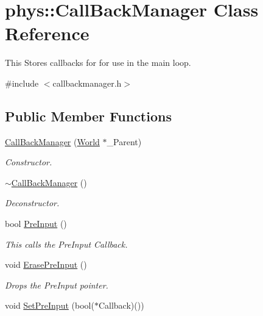 \hypertarget{classphys_1_1CallBackManager}{
\section{phys::CallBackManager Class Reference}
\label{d1/d47/classphys_1_1CallBackManager}
}


This Stores callbacks for for use in the main loop.  




{\ttfamily \#include $<$callbackmanager.h$>$}

\subsection*{Public Member Functions}
\begin{DoxyCompactItemize}
\item 
\hyperlink{classphys_1_1CallBackManager_a16d4c60beef774ae904cf01853d71aae}{CallBackManager} (\hyperlink{classphys_1_1World}{World} $\ast$\_\-Parent)
\begin{DoxyCompactList}\small\item\em Constructor. \item\end{DoxyCompactList}\item 
\hyperlink{classphys_1_1CallBackManager_a098b7a7822538aa6d6c4ba690f1e069d}{$\sim$CallBackManager} ()
\begin{DoxyCompactList}\small\item\em Deconstructor. \item\end{DoxyCompactList}\item 
bool \hyperlink{classphys_1_1CallBackManager_a84e782f8729f49b296691763351ee2b1}{PreInput} ()
\begin{DoxyCompactList}\small\item\em This calls the PreInput Callback. \item\end{DoxyCompactList}\item 
void \hyperlink{classphys_1_1CallBackManager_ae3da6f1eb10cdf4d8551aaeeda73053c}{ErasePreInput} ()
\begin{DoxyCompactList}\small\item\em Drops the PreInput pointer. \item\end{DoxyCompactList}\item 
void \hyperlink{classphys_1_1CallBackManager_a1efb0c185304376986093beebf08a277}{SetPreInput} (bool($\ast$Callback)())

\end{DoxyCompactItemize}

